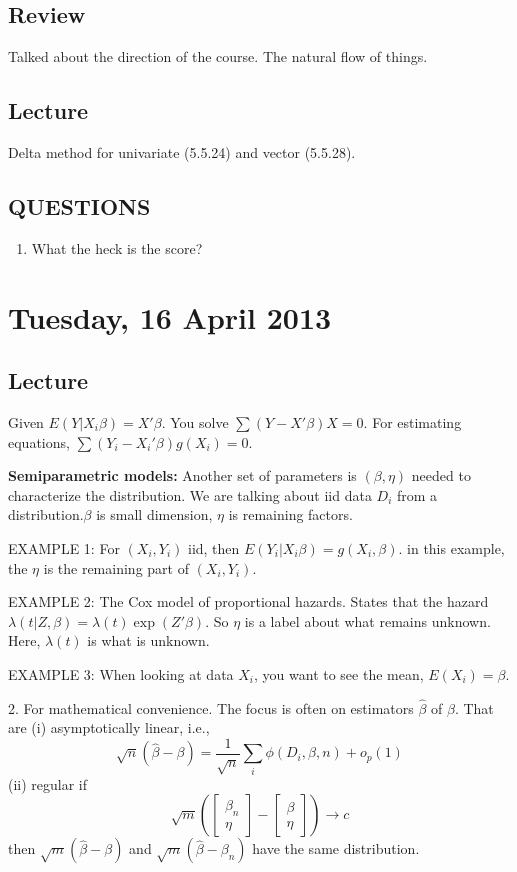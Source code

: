 \documentclass[letterpaper, 12pt]{article}
\theoremstyle{definition}
\theoremstyle{plain}
\begin{document}
\subsection*{Review}
Talked about the direction of the course. The natural flow of things.
\subsection*{Lecture}
Delta method for univariate (5.5.24) and vector (5.5.28).
\subsection*{QUESTIONS}
\begin{enumerate}
\item
What the heck is the score?
\end{enumerate}

\section{Tuesday, 16 April 2013}
\subsection*{Lecture}
Given $E(Y | X_i \beta) = X' \beta$. You solve $\sum (Y - X' \beta) X = 0$. For estimating equations, $\sum (Y_i - X_i'\beta) g(X_i) = 0$.

\textbf{Semiparametric models:} Another set of parameters is $(\beta, \eta)$ needed to characterize the distribution. We are talking about iid data $D_i$ from a distribution.$\beta$ is small dimension, $\eta$ is remaining factors. 

EXAMPLE 1: For $(X_i, Y_i)$ iid, then $E(Y_i | X_i \beta) = g(X_i, \beta)$. in this example, the $\eta$ is the remaining part of $(X_i, Y_i)$.

EXAMPLE 2: The Cox model of proportional hazards. States that the hazard $\lambda(t | Z, \beta) = \lambda(t) \exp(Z' \beta)$. So $\eta$ is a label about what remains unknown. Here, $\lambda(t)$ is what is unknown.

EXAMPLE 3: When looking at data $X_i$, you want to see the mean, $E(X_i) = \beta$. 

2. For mathematical convenience. The focus is often on estimators $\hat{\beta}$ of $\beta$. That are (i) asymptotically linear, i.e., 
\begin{equation}
\sqrt{n} (\hat{\beta} - \beta) = \frac{1}{\sqrt{n}} \sum_i \phi(D_i, \beta, n) + o_p(1)
\end{equation}
(ii) regular if 
\begin{equation}
\sqrt{m}
\left(
\begin{bmatrix}
\beta_n \\
\eta
\end{bmatrix}
-
\begin{bmatrix}
\beta \\
\eta
\end{bmatrix}
\right)
\to
c
\end{equation}
then $\sqrt{m} (\hat{\beta} - \beta)$ and $\sqrt{m} (\hat{\beta} - \beta_n)$ have the same distribution.
\end{document}
